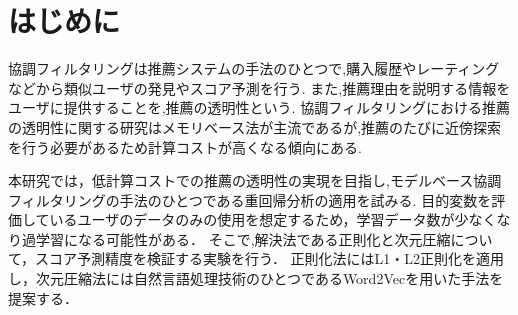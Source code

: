 \section{はじめに}
協調フィルタリングは推薦システムの手法のひとつで,購入履歴やレーティングなどから類似ユーザの発見やスコア予測を行う.
また,推薦理由を説明する情報をユーザに提供することを,推薦の透明性という.
協調フィルタリングにおける推薦の透明性に関する研究\cite{sinha}\cite{ged}はメモリベース法が主流であるが,推薦のたびに近傍探索を行う必要があるため計算コストが高くなる傾向にある.

本研究では，低計算コストでの推薦の透明性の実現を目指し,モデルベース協調フィルタリングの手法のひとつである重回帰分析の適用を試みる.
目的変数を評価しているユーザのデータのみの使用を想定するため，学習データ数が少なくなり過学習になる可能性がある．
そこで,解決法である正則化と次元圧縮について，スコア予測精度を検証する実験を行う．
正則化法にはL1・L2正則化を適用し，次元圧縮法には自然言語処理技術のひとつであるWord2Vec\cite{mik}を用いた手法を提案する．

